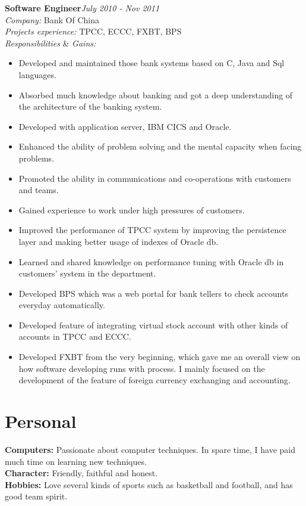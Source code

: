 \documentclass[line, margin, 11pt]{res}
\begin{document}
\begin{resume}
{\bf Software Engineer}\hfill {\it July 2010 - Nov 2011}\\
{\sl Company:} Bank Of China\\
{\sl Projects experience:} TPCC, ECCC, FXBT, BPS\\
{\sl Responsibilities} \& {\sl Gains:}
\begin{itemize}
\item Developed and maintained those bank systems based on C, Java and Sql languages.
\item Absorbed much knowledge about banking and got a deep understanding of the architecture of the banking system.
\item Developed with application server, IBM CICS and Oracle.
\item Enhanced the ability of problem solving and the mental capacity when facing problems.
\item Promoted the ability in communications and co-operations with customers and teams.
\item Gained experience to work under high pressures of customers.
\item Improved the performance of TPCC system by improving the persistence layer and making better usage of indexes of Oracle db.
\item Learned and shared knowledge on performance tuning with Oracle db in customers' system in the department.
\item Developed BPS which was a web portal for bank tellers to check accounts everyday automatically.
\item Developed feature of integrating virtual stock account with other kinds of accounts in TPCC and ECCC.
\item Developed FXBT from the very beginning, which gave me an overall view on how software developing runs with process. I mainly focused on the development of the feature of foreign currency exchanging and accounting.
\end{itemize}

\section{Personal}
{\bf Computers:} Passionate about computer techniques. In spare time, I have paid much time on learning new techniques.\\
{\bf Character:} Friendly, faithful and honest.\\
{\bf Hobbies:} Love several kinds of sports such as basketball and football, and has good team spirit.\\
\end{resume}
\end{document}
